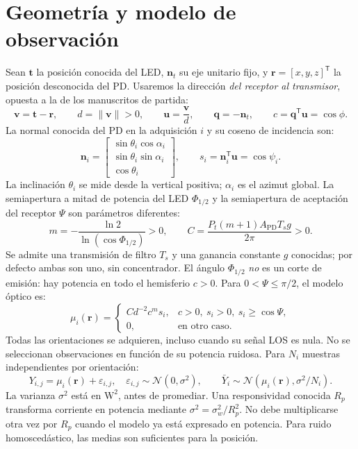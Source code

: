 \documentclass[11pt,a4paper]{article}
\begin{document}
\section{Geometría y modelo de observación}
Sean $\mathbf t$ la posición conocida del LED, $\mathbf n_t$ su eje unitario fijo, y $\mathbf r=[x,y,z]^{\mathsf T}$ la posición desconocida del PD. Usaremos la dirección \emph{del receptor al transmisor}, opuesta a la de los manuscritos de partida:
\begin{equation}
\mathbf v=\mathbf t-\mathbf r,\qquad d=\|\mathbf v\|>0,\qquad
\mathbf u=\frac{\mathbf v}{d},\qquad \mathbf q=-\mathbf n_t,\qquad
c=\mathbf q^{\mathsf T}\mathbf u=\cos\phi.
\label{eq:geometry}
\end{equation}
La normal conocida del PD en la adquisición $i$ y su coseno de incidencia son:
\begin{equation}
\mathbf n_i=\begin{bmatrix}\sin\theta_i\cos\alpha_i\\\sin\theta_i\sin\alpha_i\\\cos\theta_i\end{bmatrix},\qquad
s_i=\mathbf n_i^{\mathsf T}\mathbf u=\cos\psi_i.
\label{eq:normals}
\end{equation}
La inclinación $\theta_i$ se mide desde la vertical positiva; $\alpha_i$ es el azimut global. La semiapertura a mitad de potencia del LED $\Phi_{1/2}$ y la semiapertura de aceptación del receptor $\Psi$ son parámetros diferentes:
\begin{equation}
m=-\frac{\ln 2}{\ln(\cos\Phi_{1/2})}>0,\qquad
C=\frac{P_t(m+1)A_{\mathrm{PD}}T_s g}{2\pi}>0.
\label{eq:C}
\end{equation}
Se admite una transmisión de filtro $T_s$ y una ganancia constante $g$ conocidas; por defecto ambas son uno, sin concentrador. El ángulo $\Phi_{1/2}$ \emph{no} es un corte de emisión: hay potencia en todo el hemisferio $c>0$. Para $0<\Psi\leq\pi/2$, el modelo óptico es:
\begin{equation}
\mu_i(\mathbf r)=\begin{cases}
C d^{-2}c^m s_i,&c>0,\ s_i>0,\ s_i\geq\cos\Psi,\\
0,&\text{en otro caso}.
\end{cases}
\label{eq:mean}
\end{equation}
Todas las orientaciones se adquieren, incluso cuando su señal LOS es nula. No se seleccionan observaciones en función de su potencia ruidosa. Para $N_i$ muestras independientes por orientación:
\begin{equation}
Y_{i,j}=\mu_i(\mathbf r)+\varepsilon_{i,j},\quad
\varepsilon_{i,j}\sim\mathcal N(0,\sigma^2),\qquad
\bar Y_i\sim\mathcal N(\mu_i(\mathbf r),\sigma^2/N_i).
\label{eq:noise}
\end{equation}
La varianza $\sigma^2$ está en $\mathrm W^2$, antes de promediar. Una responsividad conocida $R_p$ transforma corriente en potencia mediante $\sigma^2=\sigma_w^2/R_p^2$. No debe multiplicarse otra vez por $R_p$ cuando el modelo ya está expresado en potencia. Para ruido homoscedástico, las medias son suficientes para la posición.
\end{document}
